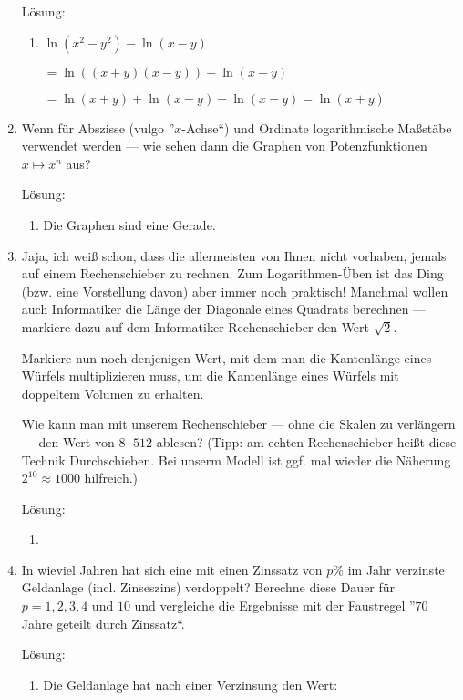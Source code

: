 \documentclass[main.tex]{subfiles}
\begin{document}
\begin{enumerate}
	      Lösung:
	      \begin{enumerate}
		      \item \( \ln(x^2 - y^2) - \ln(x - y) \)

		            \( = \ln((x + y)(x - y)) - \ln(x - y) \)

		            \( = \ln(x + y) + \ln(x - y) - \ln(x - y)
		            = \ln (x + y) \)
	      \end{enumerate}
	\item Wenn für Abszisse (vulgo ”\( x \)-Achse“) und Ordinate logarithmische
	      Maßstäbe verwendet werden —
	      wie sehen dann die Graphen von Potenzfunktionen \( x \mapsto x^n \) aus?

	      Lösung:
	      \begin{enumerate}
		      \item Die Graphen sind eine Gerade.
	      \end{enumerate}
	\item Jaja, ich weiß schon, dass die allermeisten von Ihnen nicht vorhaben, jemals auf einem Rechenschieber zu rechnen.
	      Zum Logarithmen-Üben ist das Ding (bzw. eine Vorstellung davon) aber immer noch praktisch!
	      Manchmal wollen auch Informatiker die Länge der Diagonale eines Quadrats berechnen — markiere dazu auf dem
	      Informatiker-Rechenschieber den Wert \( \sqrt{2} \).

	      Markiere nun noch denjenigen Wert, mit dem man die Kantenlänge eines Würfels multiplizieren muss,
	      um die Kantenlänge eines Würfels mit doppeltem Volumen zu erhalten.

	      Wie kann man mit unserem Rechenschieber — ohne die Skalen zu verlängern —
	      den Wert von \( 8 \cdot 512 \) ablesen?
	      (Tipp: am echten Rechenschieber heißt diese Technik Durchschieben. Bei unserm Modell ist ggf.
	      mal wieder die Näherung \( 2^{10} \approx 1000 \) hilfreich.)

	      Lösung:
	      \begin{enumerate}
		      \item
	      \end{enumerate}
	\item In wieviel Jahren hat sich eine mit einen Zinssatz von \( p\% \)
	      im Jahr verzinste Geldanlage (incl. Zinseszins) verdoppelt?
	      Berechne diese Dauer für \( p = 1,2,3,4 \) und \( 10 \) und
	      vergleiche die Ergebnisse mit der Faustregel ”\( 70 \) Jahre geteilt durch
	      Zinssatz“.

	      Lösung:
	      \begin{enumerate}
		      \item Die Geldanlage hat nach einer Verzinsung den Wert:


\end{enumerate}
\end{enumerate}
\end{document}
